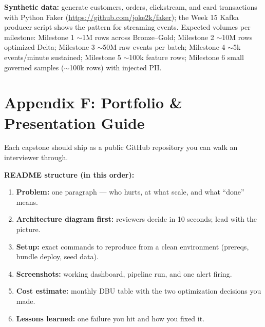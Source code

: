 \documentclass[11pt, a4paper]{article}
\begin{document}
\noindent\textbf{Synthetic data:} generate customers, orders, clickstream, and card transactions with Python Faker (\url{https://github.com/joke2k/faker}); the Week 15 Kafka producer script shows the pattern for streaming events. Expected volumes per milestone: Milestone 1 $\sim$1M rows across Bronze--Gold; Milestone 2 $\sim$10M rows optimized Delta; Milestone 3 $\sim$50M raw events per batch; Milestone 4 $\sim$5k events/minute sustained; Milestone 5 $\sim$100k feature rows; Milestone 6 small governed samples ($\sim$100k rows) with injected PII.

\section{Appendix F: Portfolio \& Presentation Guide}
Each capstone should ship as a public GitHub repository you can walk an interviewer through.

\noindent\textbf{README structure (in this order):}
\begin{enumerate}[itemsep=1pt]
    \item \textbf{Problem:} one paragraph --- who hurts, at what scale, and what ``done'' means.
    \item \textbf{Architecture diagram first:} reviewers decide in 10 seconds; lead with the picture.
    \item \textbf{Setup:} exact commands to reproduce from a clean environment (prereqs, bundle deploy, seed data).
    \item \textbf{Screenshots:} working dashboard, pipeline run, and one alert firing.
    \item \textbf{Cost estimate:} monthly DBU table with the two optimization decisions you made.
    \item \textbf{Lessons learned:} one failure you hit and how you fixed it.
\end{enumerate}
\end{document}
